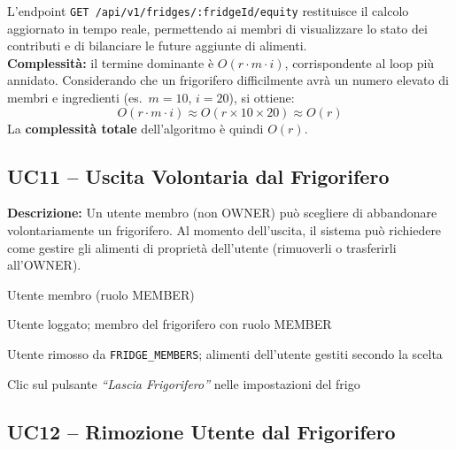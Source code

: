 \documentclass[12pt,a4paper,twoside]{report}
\newenvironment{ucbox}{%
  \begin{mdframed}[
    backgroundcolor=ucbg,
    linecolor=ucborder,
    linewidth=1pt,
    innerleftmargin=10pt,
    innerrightmargin=10pt,
    innertopmargin=8pt,
    innerbottommargin=8pt,
    roundcorner=4pt
  ]
}{%
  \end{mdframed}
}
\begin{document}
\newpage
L'endpoint \texttt{GET /api/v1/fridges/:fridgeId/equity} restituisce il calcolo aggiornato in tempo reale, permettendo ai membri di visualizzare lo stato dei contributi e di bilanciare le future aggiunte di alimenti.
\\

\textbf{Complessità:} il termine dominante è $O(r \cdot m \cdot i)$, corrispondente al loop più annidato. Considerando che un frigorifero difficilmente avrà un numero elevato di membri e ingredienti (es.\ $m = 10$, $i = 20$), si ottiene:
\[
  O(r \cdot m \cdot i) \approx O(r \times 10 \times 20) \approx O(r)
\]
La \textbf{complessità totale} dell'algoritmo è quindi $O(r)$.

\newpage
\subsection{UC11 -- Uscita Volontaria dal Frigorifero}

\begin{ucbox}
\textbf{Descrizione:} Un utente membro (non OWNER) può scegliere di abbandonare volontariamente un frigorifero. Al momento dell'uscita, il sistema può richiedere come gestire gli alimenti di proprietà dell'utente (rimuoverli o trasferirli all'OWNER).

\begin{description}[leftmargin=4cm, style=sameline]
  \item[Attori Coinvolti:] Utente membro (ruolo MEMBER)
  \item[Precondizione:] Utente loggato; membro del frigorifero con ruolo MEMBER
  \item[Postcondizione:] Utente rimosso da \texttt{FRIDGE\_MEMBERS}; alimenti dell'utente gestiti secondo la scelta
  \item[Trigger:] Clic sul pulsante \textit{``Lascia Frigorifero''} nelle impostazioni del frigo
\end{description}
\end{ucbox}

\subsection{UC12 -- Rimozione Utente dal Frigorifero}
\end{document}

